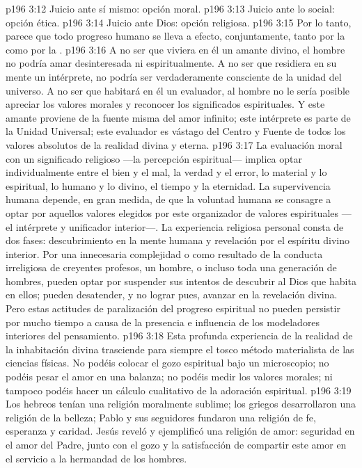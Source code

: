 \vs p196 3:12 Juicio ante sí mismo: opción moral.
\vs p196 3:13 Juicio ante lo social: opción ética.
\vs p196 3:14 Juicio ante Dios: opción religiosa.
\vs p196 3:15 \pc Por lo tanto, parece que todo progreso humano se lleva a efecto, conjuntamente, tanto por la  como por la .
\vs p196 3:16 A no ser que viviera en él un amante divino, el hombre no podría amar desinteresada ni espiritualmente. A no ser que residiera en su mente un intérprete, no podría ser verdaderamente consciente de la unidad del universo. A no ser que habitará en él un evaluador, al hombre no le sería posible apreciar los valores morales y reconocer los significados espirituales. Y este amante proviene de la fuente misma del amor infinito; este intérprete es parte de la Unidad Universal; este evaluador es vástago del Centro y Fuente de todos los valores absolutos de la realidad divina y eterna.
\vs p196 3:17 La evaluación moral con un significado religioso ---la percepción espiritual--- implica optar individualmente entre el bien y el mal, la verdad y el error, lo material y lo espiritual, lo humano y lo divino, el tiempo y la eternidad. La supervivencia humana depende, en gran medida, de que la voluntad humana se consagre a optar por aquellos valores elegidos por este organizador de valores espirituales ---el intérprete y unificador interior---. La experiencia religiosa personal consta de dos fases: descubrimiento en la mente humana y revelación por el espíritu divino interior. Por una innecesaria complejidad o como resultado de la conducta irreligiosa de creyentes profesos, un hombre, o incluso toda una generación de hombres, pueden optar por suspender sus intentos de descubrir al Dios que habita en ellos; pueden desatender, y no lograr pues, avanzar en la revelación divina. Pero estas actitudes de paralización del progreso espiritual no pueden persistir por mucho tiempo a causa de la presencia e influencia de los modeladores interiores del pensamiento.
\vs p196 3:18 Esta profunda experiencia de la realidad de la inhabitación divina trasciende para siempre el tosco método materialista de las ciencias físicas. No podéis colocar el gozo espiritual bajo un microscopio; no podéis pesar el amor en una balanza; no podéis medir los valores morales; ni tampoco podéis hacer un cálculo cualitativo de la adoración espiritual.
\vs p196 3:19 Los hebreos tenían una religión moralmente sublime; los griegos desarrollaron una religión de la belleza; Pablo y sus seguidores fundaron una religión de fe, esperanza y caridad. Jesús reveló y ejemplificó una religión de amor: seguridad en el amor del Padre, junto con el gozo y la satisfacción de compartir este amor en el servicio a la hermandad de los hombres.
